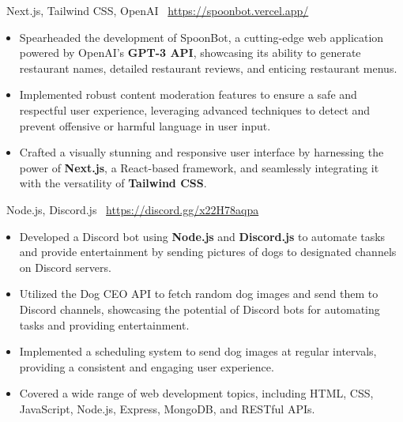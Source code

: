 \documentclass[9pt,a4paper,withhyper]{altacv}
\begin{document}
\begin{paracol}{2}
	\divider
			
	\vspace{-0.25em}
	{\small \faCode\,\,\,Next.js, Tailwind CSS, OpenAI}\newline
	{\small \faDesktop\,\,\,\url{https://spoonbot.vercel.app/}}
	\vspace{.50em}
	\begin{itemize}
		\item Spearheaded the development of SpoonBot, a cutting-edge web application powered by OpenAI's \textbf{GPT-3 API}, showcasing its ability to generate restaurant names, detailed restaurant reviews, and enticing restaurant menus.
		\item Implemented robust content moderation features to ensure a safe and respectful user experience, leveraging advanced techniques to detect and prevent offensive or harmful language in user input.
		\item Crafted a visually stunning and responsive user interface by harnessing the power of \textbf{Next.js}, a React-based framework, and seamlessly integrating it with the versatility of \textbf{Tailwind CSS}.
	\end{itemize}
	\divider
	\vspace{-0.25em}
	{\small \faCode\,\,\,Node.js, Discord.js}\newline
	{\small \faDesktop\,\,\,\url{https://discord.gg/x22H78aqpa}}
	\vspace{.50em}
	\begin{itemize}
		\item Developed a Discord bot using \textbf{Node.js} and \textbf{Discord.js} to automate tasks and provide entertainment by sending pictures of dogs to designated channels on Discord servers.
		\item Utilized the Dog CEO API to fetch random dog images and send them to Discord channels, showcasing the potential of Discord bots for automating tasks and providing entertainment.
		\item Implemented a scheduling system to send dog images at regular intervals, providing a consistent and engaging user experience.
	\end{itemize}
	\switchcolumn
			
			
	\begin{itemize}
		\item Covered a wide range of web development topics, including HTML, CSS, JavaScript, Node.js, Express, MongoDB, and RESTful APIs.
	\end{itemize}
	

\end{paracol}
\end{document}
